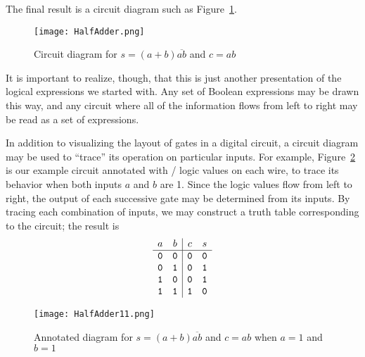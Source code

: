 The final result is a circuit diagram such as Figure~\ref{fig:exprcircuit}.
\begin{figure}
\begin{center}
\texttt{[image: HalfAdder.png]}
\end{center}
\caption{Circuit diagram for $s=(a+b)\overline{ab}$ and $c=ab$}
\label{fig:exprcircuit}
\end{figure}

It is important to realize, though, that this is just another presentation of the logical expressions we started with. Any set of Boolean expressions may be drawn this way, and any circuit where all of the information flows from left to right may be read as a set of expressions.

In addition to visualizing the layout of gates in a digital circuit, a circuit diagram may be used to ``trace'' its operation on particular inputs. For example, Figure~\ref{fig:exprcircuit11} is our example circuit annotated with \0/\1 logic values on each wire, to trace its behavior when both inputs $a$ and $b$ are 1. Since the logic values flow from left to right, the output of each successive gate may be determined from its inputs. By tracing each combination of inputs, we may construct a truth table corresponding to the circuit; the result is
\[ \begin{array}{cc|cc}
a  & b  & c & s\\ \hline
\mathtt{0} & \mathtt{0} & \mathtt{0} & \mathtt{0}\\
\mathtt{0} & \mathtt{1} & \mathtt{0} & \mathtt{1}\\
\mathtt{1} & \mathtt{0} & \mathtt{0} & \mathtt{1}\\
\mathtt{1} & \mathtt{1} & \mathtt{1} & \mathtt{0}
\end{array} \]
\begin{figure}
\begin{center}
\texttt{[image: HalfAdder11.png]}
\end{center}
\caption{Annotated diagram for $s=(a+b)\overline{ab}$ and $c=ab$ when $a=1$ and $b=1$}
\label{fig:exprcircuit11}
\end{figure}

